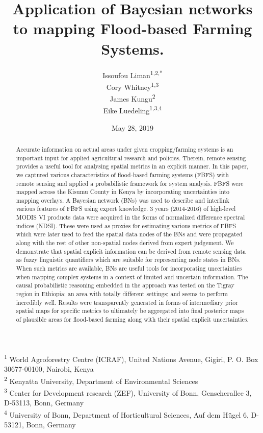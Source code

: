 \documentclass[12pt,oneside]{article}
\title{Application of Bayesian networks to mapping Flood-based Farming Systems.}
\author{Issoufou Liman\textsuperscript{1,2,*} \\ Cory Whitney\textsuperscript{1,3} \\ James Kungu\textsuperscript{2} \\ Eike Luedeling\textsuperscript{1,3,4}}
\date{May 28, 2019}
\begin{document}
\maketitle
\begin{abstract}
Accurate information on actual areas under given cropping/farming systems is an important input for applied agricultural research and policies. Therein, remote sensing provides a useful tool for analysing spatial metrics in an explicit manner. In this paper, we captured various characteristics of flood-based farming systems (FBFS) with remote sensing and applied a probabilistic framework for system analysis. FBFS were mapped across the Kisumu County in Kenya by incorporating uncertainties into mapping overlays. A Bayesian network (BNs) was used to describe and interlink various features of FBFS using expert knowledge. 3 years (2014-2016) of high-level MODIS VI products data were acquired in the forms of normalized difference spectral indices (NDSI). These were used as proxies for estimating various metrics of FBFS which were later used to feed the spatial data nodes of the BNs and were propagated along with the rest of other non-spatial nodes derived from expert judgement. We demonstrate that spatial explicit information can be derived from remote sensing data as fuzzy linguistic quantifiers which are suitable for representing node states in BNs. When such metrics are available, BNs are useful tools for incorporating uncertainties when mapping complex systems in a context of limited and uncertain information. The causal probabilistic reasoning embedded in the approach was tested on the Tigray region in Ethiopia; an area with totally different settings; and seems to perform incredibly well. Results were transparently generated in forms of intermediary prior spatial maps for specific metrics to ultimately be aggregated into final posterior maps of plausible areas for flood-based farming along with their spatial explicit uncertainties.
\end{abstract}

{
\hypersetup{linkcolor=black}
\setcounter{tocdepth}{5}
\tableofcontents
}
\textsuperscript{1} World Agroforestry Centre (ICRAF), United Nations Avenue, Gigiri, P. O. Box 30677-00100, Nairobi, Kenya\\
\textsuperscript{2} Kenyatta University, Department of Environmental Sciences\\
\textsuperscript{3} Center for Development research (ZEF), University of Bonn, Genscherallee 3, D-53113, Bonn, Germany\\
\textsuperscript{4} University of Bonn, Department of Horticultural Sciences, Auf dem Hügel 6, D-53121, Bonn, Germany
\end{document}
